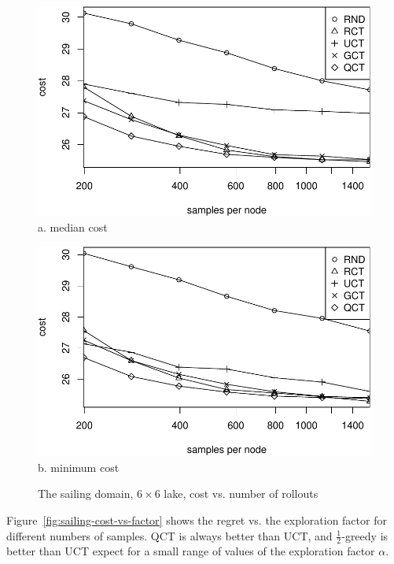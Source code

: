 \documentclass[letterpaper]{article}
\begin{document}
\begin{figure}[t]
  \begin{minipage}[b]{1.0\linewidth}
    \centering
    \includegraphics[scale=0.45]{costs-size=6-group=median.pdf}\\
    a. median cost
    \vspace{1em}
  \end{minipage}
  \begin{minipage}[b]{1.0\linewidth}
    \centering
    \includegraphics[scale=0.45]{costs-size=6-group=minimum.pdf}\\
    b. minimum cost
  \end{minipage}
  \caption{The sailing domain, $6\times 6$ lake, cost vs. number of rollouts}
  \label{fig:sailing-cost-vs-nsamples}
\end{figure}

Figure~\ref{fig:sailing-cost-vs-factor} shows the regret vs. the
exploration factor for different numbers of samples. QCT is always better than
UCT, and $\frac 1 2$-greedy is better than UCT expect for a small range of
values of the exploration factor $\alpha$. 
\end{document}
